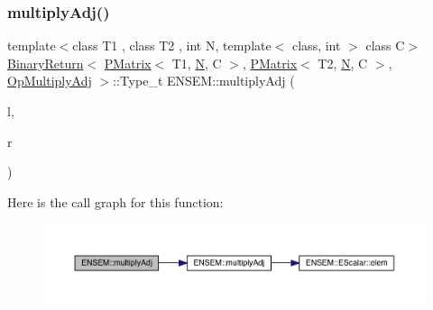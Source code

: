 \subsubsection{\texorpdfstring{multiplyAdj()}{multiplyAdj()}\hspace{0.1cm}{\footnotesize\ttfamily [3/3]}}
{\footnotesize\ttfamily template$<$class T1 , class T2 , int N, template$<$ class, int $>$ class C$>$ \\
\mbox{\hyperlink{structENSEM_1_1BinaryReturn}{Binary\+Return}}$<$ \mbox{\hyperlink{classENSEM_1_1PMatrix}{P\+Matrix}}$<$ T1, \mbox{\hyperlink{adat__devel_2lib_2hadron_2operator__name__util_8cc_a7722c8ecbb62d99aee7ce68b1752f337}{N}}, C $>$, \mbox{\hyperlink{classENSEM_1_1PMatrix}{P\+Matrix}}$<$ T2, \mbox{\hyperlink{adat__devel_2lib_2hadron_2operator__name__util_8cc_a7722c8ecbb62d99aee7ce68b1752f337}{N}}, C $>$, \mbox{\hyperlink{structENSEM_1_1OpMultiplyAdj}{Op\+Multiply\+Adj}} $>$\+::Type\+\_\+t E\+N\+S\+E\+M\+::multiply\+Adj (\begin{DoxyParamCaption}\item[{const \mbox{\hyperlink{classENSEM_1_1PMatrix}{P\+Matrix}}$<$ T1, \mbox{\hyperlink{adat__devel_2lib_2hadron_2operator__name__util_8cc_a7722c8ecbb62d99aee7ce68b1752f337}{N}}, C $>$ \&}]{l,  }\item[{const \mbox{\hyperlink{classENSEM_1_1PMatrix}{P\+Matrix}}$<$ T2, \mbox{\hyperlink{adat__devel_2lib_2hadron_2operator__name__util_8cc_a7722c8ecbb62d99aee7ce68b1752f337}{N}}, C $>$ \&}]{r }\end{DoxyParamCaption})\hspace{0.3cm}{\ttfamily [inline]}}

Here is the call graph for this function\+:\nopagebreak
\begin{figure}[H]
\begin{center}
\leavevmode
\includegraphics[width=350pt]{df/d0a/group__primmatrix_gaf37104443218a1cbaa8ab848065a0a09_cgraph}
\end{center}
\end{figure}
\mbox{\label{group__primmatrix_ga9edd8305793268c1fbc1b874baa000d3}} 
